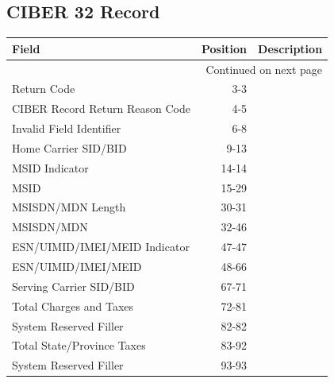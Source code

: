 \documentclass[12pt,twoside]{article}
\begin{document}
\normalsize
\subsection{CIBER 32 Record}
\label{sec-6-4}

\footnotesize
\begin{longtable}{lrr}

\hline
 \textbf{Field}                            &  \textbf{Position}  &  \textbf{Description} \\
\hline
\endhead
\hline\multicolumn{3}{r}{Continued on next page}\
\endfoot
\endlastfoot
 Record Type                               &                1-2  &                        \\
 Return Code                               &                3-3  &                        \\
 CIBER Record Return Reason Code           &                4-5  &                        \\
 Invalid Field Identifier                  &                6-8  &                        \\
 Home Carrier SID/BID                      &               9-13  &                        \\
 MSID Indicator                            &              14-14  &                        \\
 MSID                                      &              15-29  &                        \\
 MSISDN/MDN Length                         &              30-31  &                        \\
 MSISDN/MDN                                &              32-46  &                        \\
 ESN/UIMID/IMEI/MEID Indicator             &              47-47  &                        \\
 ESN/UIMID/IMEI/MEID                       &              48-66  &                        \\
 Serving Carrier SID/BID                   &              67-71  &                        \\
 Total Charges and Taxes                   &              72-81  &                        \\
 System Reserved Filler                    &              82-82  &                        \\
 Total State/Province Taxes                &              83-92  &                        \\
 System Reserved Filler                    &              93-93  &                        \\

\end{longtable}
\end{document}
